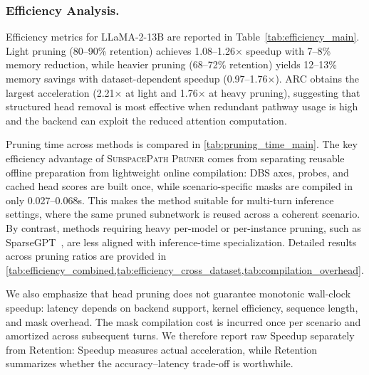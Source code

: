 \subsubsection{Efficiency Analysis.} 
\vspace{-1mm}
Efficiency metrics for LLaMA-2-13B are reported in Table~\ref{tab:efficiency_main}. 
Light pruning (80--90\% retention) achieves 1.08--1.26$\times$ speedup with 7--8\% memory reduction, while heavier pruning (68--72\% retention) yields 12--13\% memory savings with dataset-dependent speedup (0.97--1.76$\times$). 
ARC obtains the largest acceleration (2.21$\times$ at light and 1.76$\times$ at heavy pruning), suggesting that structured head removal is most effective when redundant pathway usage is high and the backend can exploit the reduced attention computation.

Pruning time across methods is compared in \cref{tab:pruning_time_main}. 
The key efficiency advantage of \textsc{SubspacePath Pruner} comes from separating reusable offline preparation from lightweight online compilation: DBS axes, probes, and cached head scores are built once, while scenario-specific masks are compiled in only 0.027--0.068s. 
This makes the method suitable for multi-turn inference settings, where the same pruned subnetwork is reused across a coherent scenario. 
By contrast, methods requiring heavy per-model or per-instance pruning, such as SparseGPT~\cite{frantar2023sparsegpt}, are less aligned with inference-time specialization. 
Detailed results across pruning ratios are provided in \cref{tab:efficiency_combined,tab:efficiency_cross_dataset,tab:compilation_overhead}.

We also emphasize that head pruning does not guarantee monotonic wall-clock speedup: latency depends on backend support, kernel efficiency, sequence length, and mask overhead. 
The mask compilation cost is incurred once per scenario and amortized across subsequent turns. 
We therefore report raw Speedup separately from Retention: Speedup measures actual acceleration, while Retention summarizes whether the accuracy--latency trade-off is worthwhile.


